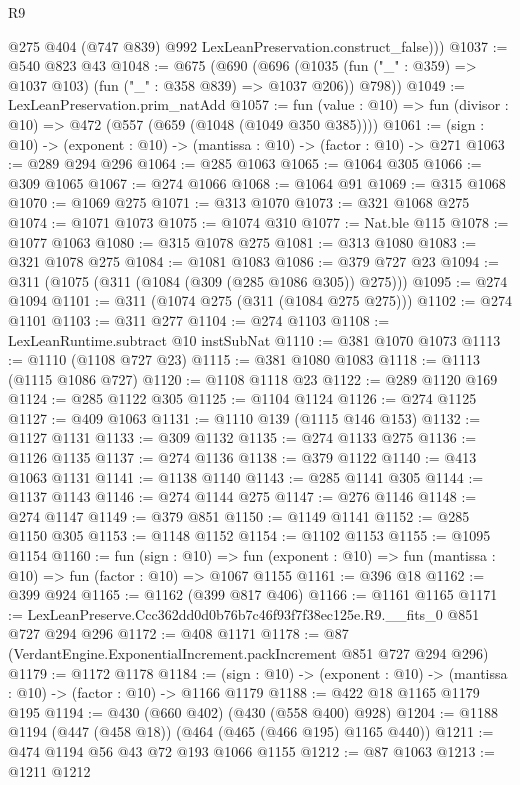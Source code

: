 \begin{lexlean}{R9}
\begin{coremodule}
          @275
          @404
          (@747 @839)
          @992
          LexLeanPreservation.construct_false)))
@1037 := @540 @823 @43
@1048 := @675
    (@690
      (@696 (@1035 (fun ("_" : @359) => @1037 @103) (fun ("_" : @358 @839) => @1037 @206)) @798))
@1049 := LexLeanPreservation.prim_natAdd
@1057 := fun (value : @10) => fun (divisor : @10) => @472 (@557 (@659 (@1048 (@1049 @350 @385))))
@1061 := (sign : @10) -> (exponent : @10) -> (mantissa : @10) -> (factor : @10) -> @271
@1063 := @289 @294 @296
@1064 := @285 @1063
@1065 := @1064 @305
@1066 := @309 @1065
@1067 := @274 @1066
@1068 := @1064 @91
@1069 := @315 @1068
@1070 := @1069 @275
@1071 := @313 @1070
@1073 := @321 @1068 @275
@1074 := @1071 @1073
@1075 := @1074 @310
@1077 := Nat.ble @115
@1078 := @1077 @1063
@1080 := @315 @1078 @275
@1081 := @313 @1080
@1083 := @321 @1078 @275
@1084 := @1081 @1083
@1086 := @379 @727 @23
@1094 := @311 (@1075 (@311 (@1084 (@309 (@285 @1086 @305)) @275)))
@1095 := @274 @1094
@1101 := @311 (@1074 @275 (@311 (@1084 @275 @275)))
@1102 := @274 @1101
@1103 := @311 @277
@1104 := @274 @1103
@1108 := LexLeanRuntime.subtract @10 instSubNat
@1110 := @381 @1070 @1073
@1113 := @1110 (@1108 @727 @23)
@1115 := @381 @1080 @1083
@1118 := @1113 (@1115 @1086 @727)
@1120 := @1108 @1118 @23
@1122 := @289 @1120 @169
@1124 := @285 @1122 @305
@1125 := @1104 @1124
@1126 := @274 @1125
@1127 := @409 @1063
@1131 := @1110 @139 (@1115 @146 @153)
@1132 := @1127 @1131
@1133 := @309 @1132
@1135 := @274 @1133 @275
@1136 := @1126 @1135
@1137 := @274 @1136
@1138 := @379 @1122
@1140 := @413 @1063 @1131
@1141 := @1138 @1140
@1143 := @285 @1141 @305
@1144 := @1137 @1143
@1146 := @274 @1144 @275
@1147 := @276 @1146
@1148 := @274 @1147
@1149 := @379 @851
@1150 := @1149 @1141
@1152 := @285 @1150 @305
@1153 := @1148 @1152
@1154 := @1102 @1153
@1155 := @1095 @1154
@1160 := fun (sign : @10) =>
  fun (exponent : @10) => fun (mantissa : @10) => fun (factor : @10) => @1067 @1155
@1161 := @396 @18
@1162 := @399 @924
@1165 := @1162 (@399 @817 @406)
@1166 := @1161 @1165
@1171 := LexLeanPreserve.Ccc362dd0d0b76b7c46f93f7f38ec125e.R9.__fits_0 @851 @727 @294 @296
@1172 := @408 @1171
@1178 := @87 (VerdantEngine.ExponentialIncrement.packIncrement @851 @727 @294 @296)
@1179 := @1172 @1178
@1184 := (sign : @10) -> (exponent : @10) -> (mantissa : @10) -> (factor : @10) -> @1166 @1179
@1188 := @422 @18 @1165 @1179 @195
@1194 := @430 (@660 @402) (@430 (@558 @400) @928)
@1204 := @1188 @1194 (@447 (@458 @18)) (@464 (@465 (@466 @195) @1165 @440))
@1211 := @474 @1194 @56 @43 @72 @193 @1066 @1155
@1212 := @87 @1063
@1213 := @1211 @1212

\end{coremodule}
\end{lexlean}
